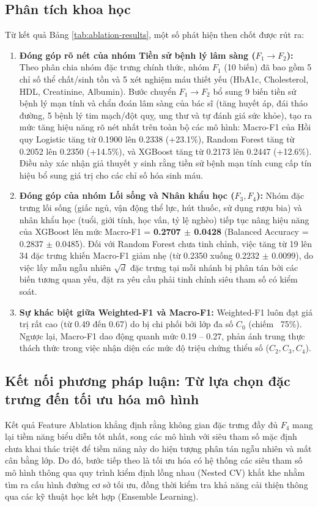 \subsection{Phân tích khoa học}
Từ kết quả Bảng \ref{tab:ablation-results}, một số phát hiện then chốt được rút ra:
\begin{enumerate}
    \item \textbf{Đóng góp rõ nét của nhóm Tiền sử bệnh lý lâm sàng ($F_1 \to F_2$):} Theo phân chia nhóm đặc trưng chính thức, nhóm $F_1$ (10 biến) đã bao gồm 5 chỉ số thể chất/sinh tồn và 5 xét nghiệm máu thiết yếu (HbA1c, Cholesterol, HDL, Creatinine, Albumin). Bước chuyển $F_1 \to F_2$ bổ sung 9 biến tiền sử bệnh lý mạn tính và chẩn đoán lâm sàng của bác sĩ (tăng huyết áp, đái tháo đường, 5 bệnh lý tim mạch/đột quỵ, ung thư và tự đánh giá sức khỏe), tạo ra mức tăng hiệu năng rõ nét nhất trên toàn bộ các mô hình: Macro-F1 của Hồi quy Logistic tăng từ 0.1900 lên 0.2338 (+23.1\%), Random Forest tăng từ 0.2052 lên 0.2350 (+14.5\%), và XGBoost tăng từ 0.2173 lên 0.2447 (+12.6\%). Điều này xác nhận giả thuyết y sinh rằng tiền sử bệnh mạn tính cung cấp tín hiệu bổ sung giá trị cho các chỉ số hóa sinh máu.
    \item \textbf{Đóng góp của nhóm Lối sống và Nhân khẩu học ($F_3, F_4$):} Nhóm đặc trưng lối sống (giấc ngủ, vận động thể lực, hút thuốc, sử dụng rượu bia) và nhân khẩu học (tuổi, giới tính, học vấn, tỷ lệ nghèo) tiếp tục nâng hiệu năng của XGBoost lên mức Macro-F1 = \textbf{0.2707 $\pm$ 0.0428} (Balanced Accuracy = 0.2837 $\pm$ 0.0485). Đối với Random Forest chưa tinh chỉnh, việc tăng từ 19 lên 34 đặc trưng khiến Macro-F1 giảm nhẹ (từ 0.2350 xuống 0.2232 $\pm$ 0.0099), do việc lấy mẫu ngẫu nhiên $\sqrt{d}$ đặc trưng tại mỗi nhánh bị phân tán bởi các biến tương quan yếu, đặt ra yêu cầu phải tinh chỉnh siêu tham số có kiểm soát.
    \item \textbf{Sự khác biệt giữa Weighted-F1 và Macro-F1:} Weighted-F1 luôn đạt giá trị rất cao (từ 0.49 đến 0.67) do bị chi phối bởi lớp đa số $C_0$ (chiếm ~75\%). Ngược lại, Macro-F1 dao động quanh mức 0.19 -- 0.27, phản ánh trung thực thách thức trong việc nhận diện các mức độ triệu chứng thiểu số ($C_2, C_3, C_4$).
\end{enumerate}

\subsection{Kết nối phương pháp luận: Từ lựa chọn đặc trưng đến tối ưu hóa mô hình}
Kết quả Feature Ablation khẳng định rằng không gian đặc trưng đầy đủ $F_4$ mang lại tiềm năng biểu diễn tốt nhất, song các mô hình với siêu tham số mặc định chưa khai thác triệt để tiềm năng này do hiện tượng phân tán ngẫu nhiên và mất cân bằng lớp. Do đó, bước tiếp theo là tối ưu hóa có hệ thống các siêu tham số mô hình thông qua quy trình kiểm định lồng nhau (Nested CV) khắt khe nhằm tìm ra cấu hình đường cơ sở tối ưu, đồng thời kiểm tra khả năng cải thiện thông qua các kỹ thuật học kết hợp (Ensemble Learning).


